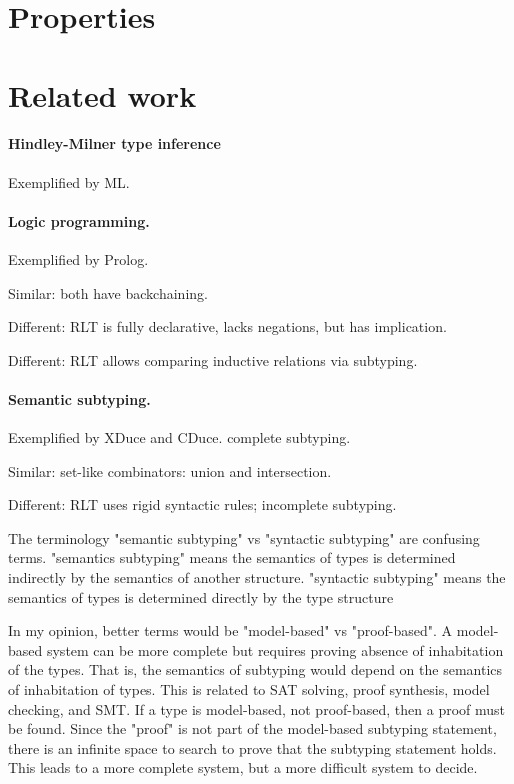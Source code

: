 \documentclass[acmsmall]{acmart}
\begin{document}
\section{Properties}

\section{Related work}

\paragraph{Hindley-Milner type inference}
Exemplified by ML.

\paragraph{Logic programming.}
Exemplified by Prolog. 

Similar: both have backchaining. 

Different: RLT is fully declarative, lacks negations, but has implication. 

Different: RLT allows comparing inductive relations via subtyping. 

\paragraph{Semantic subtyping.} 
Exemplified by XDuce and CDuce. complete subtyping.

Similar: set-like combinators: union and intersection.

Different: RLT uses rigid syntactic rules; incomplete subtyping.

The terminology "semantic subtyping" vs "syntactic subtyping" are confusing terms. 
"semantics subtyping" means the semantics of types is determined indirectly by the semantics of another structure.
"syntactic subtyping" means the semantics of types is determined directly by the type structure

In my opinion, better terms would be "model-based" vs "proof-based".
A model-based system can be more complete but requires proving absence of inhabitation of the types.
That is, the semantics of subtyping would depend on the semantics of inhabitation of types.
This is related to SAT solving, proof synthesis, model checking, and SMT.
If a type is model-based, not proof-based, then a proof must be found.
Since the "proof" is not part of the model-based subtyping statement, 
there is an infinite space to search to prove that the subtyping statement holds.
This leads to a more complete system, but a more difficult system to decide.
\end{document}

